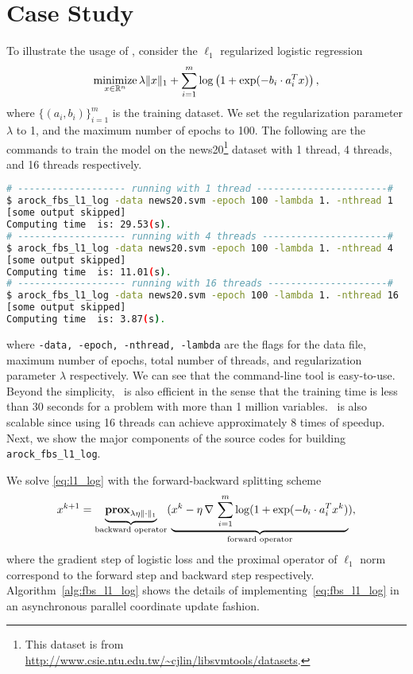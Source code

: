 \section{Case Study}\label{sec:quick_start}
To illustrate the  usage of \pkg, consider the $\ell_1$ regularized logistic regression
\begin{equation}\label{eq:l1_log}
\operatorname*{minimize}_{x \in \mathbb{R}^n} \lambda \|x\|_1 + \sum_{i = 1}^m \log\left(1 + \exp(-b_i \cdot a_i^T x)\right),
\end{equation}
where $\{(a_i, b_i)\}_{i = 1}^m$ is the training dataset. We set the regularization parameter
$\lambda$ to 1, and the maximum number of epochs to 100. The following are the commands to train the model
on the news20\footnote{ This dataset is from \url{http://www.csie.ntu.edu.tw/~cjlin/libsvmtools/datasets}.}
dataset with 1 thread, 4 threads, and 16 threads respectively.
\begin{lstlisting}[language=bash]
# ------------------- running with 1 thread -----------------------#
$ arock_fbs_l1_log -data news20.svm -epoch 100 -lambda 1. -nthread 1 
[some output skipped]
Computing time  is: 29.53(s).
# ------------------- running with 4 threads ----------------------#
$ arock_fbs_l1_log -data news20.svm -epoch 100 -lambda 1. -nthread 4 
[some output skipped]
Computing time  is: 11.01(s).
# ------------------- running with 16 threads ---------------------#
$ arock_fbs_l1_log -data news20.svm -epoch 100 -lambda 1. -nthread 16
[some output skipped]
Computing time  is: 3.87(s).
\end{lstlisting}
where \texttt{-data, -epoch, -nthread, -lambda} are the flags for the data file, maximum number of epochs,
total number of threads, and regularization parameter $\lambda$ respectively. We can see that the command-line
tool is easy-to-use. Beyond the simplicity, \pkg~is also efficient in the sense that the training time is
less than 30 seconds for a problem with more than 1 million variables. \pkg~is also scalable since
using 16 threads can achieve approximately 8 times of speedup. Next, we show the major components of the source
codes for building \texttt{arock\_fbs\_l1\_log}.

We solve \eqref{eq:l1_log} with the forward-backward splitting scheme
\begin{equation}\label{eq:fbs_l1_log}
  x^{k+1} = \underbrace{\mathbf{prox}_{\lambda \eta \|\cdot\|_1}}_{\text{backward operator}}
  (\underbrace{x^k - \eta \, \nabla \,\sum_{i = 1}^m \log (1 + \exp(-b_i \cdot a_i^T x^k)}_{\text{forward operator}}),
\end{equation}  
where the gradient step of logistic loss and the proximal operator of $\ell_1$ norm correspond to the
forward step and backward step respectively. Algorithm~\ref{alg:fbs_l1_log} shows the details of
implementing~\eqref{eq:fbs_l1_log} in an asynchronous parallel coordinate update fashion.

